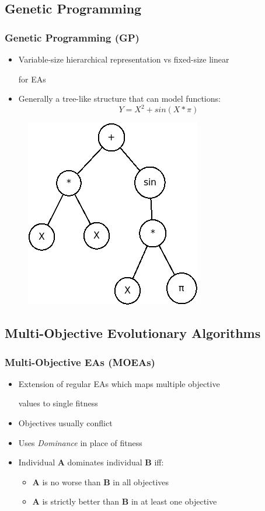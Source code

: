 \documentclass{beamer}
\begin{document}
\subsection{Genetic Programming}

\begin{frame}[fragile]
\frametitle{Genetic Programming (GP)}
\begin{itemize}
\item Variable-size hierarchical representation vs fixed-size linear

for EAs\pause
\item Generally a tree-like structure that can model functions:\pause
\begin{equation}
Y = X^2 + sin(X*\pi)
\end{equation}
\end{itemize}
\begin{figure}
\includegraphics[width=0.3\linewidth]{functionmodel.png}
\end{figure}
\end{frame}

\subsection{Multi-Objective Evolutionary Algorithms}

\begin{frame}
\frametitle{Multi-Objective EAs (MOEAs)}
\begin{itemize}
\item Extension of regular EAs which maps multiple objective

values to single fitness\pause
\item Objectives usually conflict\pause
\item Uses \textit{Dominance} in place of fitness\pause
\item Individual \textbf{A} dominates individual \textbf{B} iff:\pause
	\begin{itemize}		
	\item \textbf{A} is no worse than \textbf{B} in all objectives\pause
	\item \textbf{A} is strictly better than \textbf{B} in at least one objective
	\end{itemize}
\end{itemize}
\end{frame}
\end{document}
